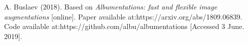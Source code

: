 \documentclass[11]{article}
\begin{document}
\newpage
\begin{thebibliography}{100}

    A. Buslaev (2018). Based on \textit{Albumentations: fast and flexible image augmentations} [online]. Paper available at:https://arxiv.org/abs/1809.06839. Code available at:https://github.com/albu/albumentations  [Accessed 3 June. 2019].







\end{thebibliography}
\end{document}
